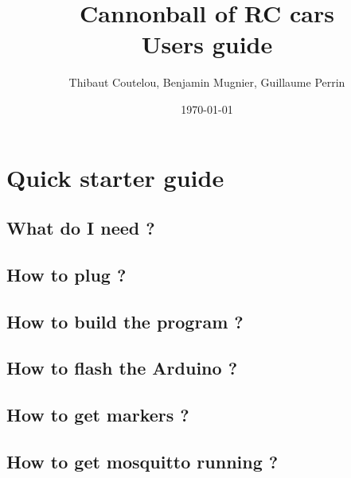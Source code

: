 \documentclass[a4paper,11pt]{report}
\title{Cannonball of RC cars\\Users guide}
\author{Thibaut Coutelou, Benjamin Mugnier, Guillaume Perrin}
\date{\today}
\begin{document}
\maketitle
\tableofcontents

\setlength{\parskip}{3mm}










\chapter{Quick starter guide}

\section{What do I need ?}

\section{How to plug ?}

\section{How to build the program ?}

\section{How to flash the Arduino ?}

\section{How to get markers ?}

\section{How to get mosquitto running ?}
\end{document}
